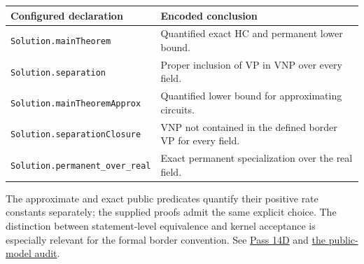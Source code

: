 \documentclass[11pt,letterpaper]{article}
\theoremstyle{definition}\newtheorem{definition}[theorem]{Definition}\newtheorem{example}[theorem]{Example}
\theoremstyle{remark}\newtheorem{remark}[theorem]{Remark}
\newcommand{\aud}[2]{\href{https://github.com/nousentllc/VP-VNP-Review/blob/567303d0bcf4f9d54390437b137752446e58ccd6/#1}{#2}}
\begin{document}
\begin{center}
\begin{tabular}{@{}p{.36\linewidth}p{.54\linewidth}@{}}\toprule
Configured declaration & Encoded conclusion \\\midrule
\texttt{Solution.mainTheorem} & Quantified exact HC and permanent lower bound.\\
\texttt{Solution.separation} & Proper inclusion of VP in VNP over every field.\\
\texttt{Solution.mainTheoremApprox} & Quantified lower bound for approximating circuits.\\
\texttt{Solution.separationClosure} & VNP not contained in the defined border VP for every field.\\
\texttt{Solution.permanent\_over\_real} & Exact permanent specialization over the real field.\\
\bottomrule\end{tabular}
\end{center}
The approximate and exact public predicates quantify their positive rate constants separately; the supplied proofs admit the same explicit choice. The distinction between statement-level equivalence and kernel acceptance is especially relevant for the formal border convention. See \aud{passes/14d-formal.md}{Pass 14D} and \aud{passes/statement-correspondence.md}{the public-model audit}.
\end{document}
